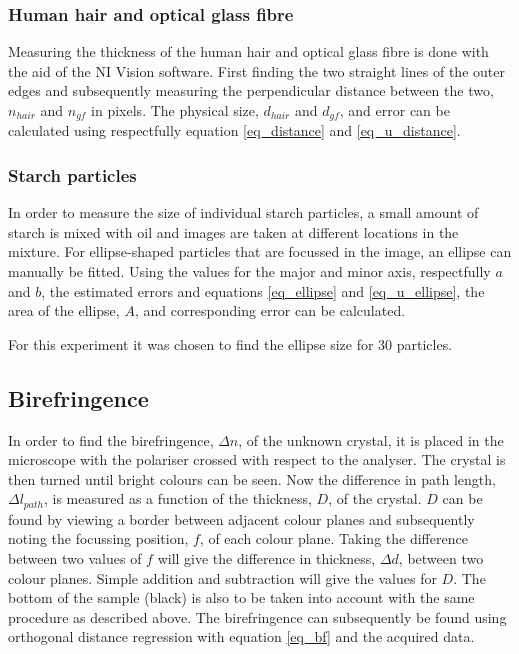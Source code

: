 \subsubsection*{Human hair and optical glass fibre}


Measuring the thickness of the human hair and optical glass fibre is done with the aid of the NI Vision software. First finding the two straight lines of the outer edges and subsequently measuring the perpendicular distance between the two, $n_{hair}$ and $n_{gf}$ in pixels. The physical size, $d_{hair}$ and $d_{gf}$, and error can be calculated using respectfully equation \ref{eq_distance} and \ref{eq_u_distance}. 


\subsubsection*{Starch particles}

In order to measure the size of individual starch particles, a small amount of starch is mixed with oil and images are taken at different locations in the mixture. For ellipse-shaped particles that are focussed in the image, an ellipse can manually be fitted. Using the values for the major and minor axis, respectfully $a$ and $b$, the estimated errors and equations \ref{eq_ellipse} and \ref{eq_u_ellipse}, the area of the ellipse, $A$, and corresponding error can be calculated.

For this experiment it was chosen to find the ellipse size for 30 particles.


\subsection{Birefringence}

In order to find the birefringence, $\Delta n$, of the unknown crystal, it is placed in the microscope with the polariser crossed with respect to the analyser. The crystal is then turned until bright colours can be seen. Now the difference in path length, $\Delta l_{path}$, is measured as a function of the thickness, $D$, of the crystal. $D$ can be found by viewing a border between adjacent colour planes and subsequently noting the focussing position, $f$, of each colour plane. Taking the difference between two values of $f$ will give the difference in thickness, $\Delta d$, between two colour planes. Simple addition and subtraction will give the values for $D$. The bottom of the sample (black) is also to be taken into account with the same procedure as described above. The birefringence can subsequently be found using orthogonal distance regression with equation \ref{eq_bf} and the acquired data.

